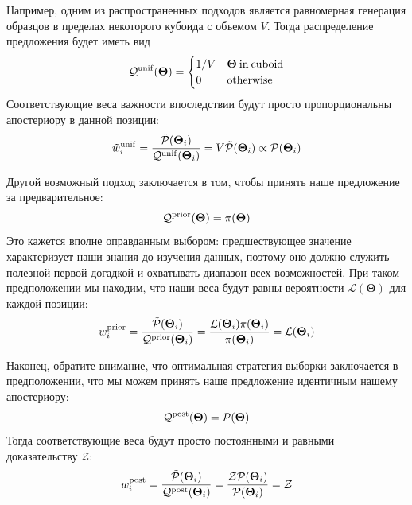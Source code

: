 \documentclass[12pt, titlepage]{article}
\newcommand{\params}{\ensuremath{\boldsymbol\Theta}}
\newcommand{\likelihood}{\ensuremath{\mathcal{L}}}
\newcommand{\prior}{\ensuremath{\pi}}
\newcommand{\posterior}{\ensuremath{\mathcal{P}}}
\newcommand{\proposal}{\ensuremath{\mathcal{Q}}}
\newcommand{\evidence}{\ensuremath{\mathcal{Z}}}
\begin{document}
Например, одним из распространенных подходов является равномерная генерация образцов в пределах некоторого кубоида с объемом $V$. Тогда распределение предложения будет иметь вид
\begin{equation}
    \proposal^{\rm unif}(\params) =
    \begin{cases}
    1/V & \params \: {\rm in\:cuboid} \\
    0 & {\rm otherwise}
    \end{cases}
\end{equation}
Соответствующие веса важности впоследствии будут просто пропорциональны апостериору в данной позиции:
\begin{equation}
    \tilde{w}_i^{\rm unif}
    = \frac{\tilde{\posterior}(\params_i)}{\proposal^{\rm unif}(\params_i)}
    = V \tilde{\posterior}(\params_i)
    \propto \posterior(\params_i)
\end{equation}

Другой возможный подход заключается в том, чтобы принять наше предложение за предварительное:
\begin{equation}
    \proposal^{\rm prior}(\params) = \prior(\params)
\end{equation}
Это кажется вполне оправданным выбором: предшествующее значение характеризует наши знания до изучения данных, поэтому оно должно служить полезной первой догадкой и охватывать диапазон всех возможностей. При таком предположении мы находим, что наши веса будут равны вероятности $\likelihood(\params)$ для каждой позиции:
\begin{equation}
    w_i^{\rm prior} 
    = \frac{\tilde{\posterior}(\params_i)}{\proposal^{\rm prior}(\params_i)}
    = \frac{\likelihood(\params_i) \prior(\params_i)}{\prior(\params_i)}
    = \likelihood(\params_i)
\end{equation}

Наконец, обратите внимание, что оптимальная стратегия выборки заключается в предположении, что мы можем принять наше предложение идентичным нашему апостериору:
\begin{equation}
    \proposal^{\rm post}(\params) = \posterior(\params)
\end{equation}
Тогда соответствующие веса будут просто постоянными и равными доказательству $\evidence$:
\begin{equation}
    w_i^{\rm post} 
    = \frac{\tilde{\posterior}(\params_i)}{\proposal^{\rm post}(\params_i)}
    = \frac{\evidence \posterior(\params_i)}{\posterior(\params_i)}
    = \evidence
\end{equation}
\end{document}
